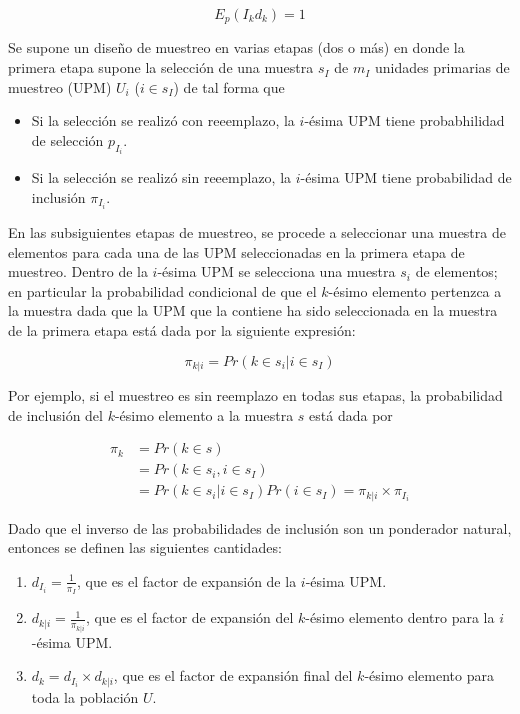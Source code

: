 \documentclass[
  12pt,
  spanish,
]{book}
\providecommand{\tightlist}{%
  \setlength{\itemsep}{0pt}\setlength{\parskip}{0pt}}
\begin{document}
\begin{equation*}
E_p(I_k d_k) = 1
\end{equation*}

Se supone un diseño de muestreo en varias etapas (dos o más) en donde la primera etapa supone la selección de una muestra \(s_I\) de \(m_I\) unidades primarias de muestreo (UPM) \(U_i\) (\(i\in s_I\)) de tal forma que

\begin{itemize}
\tightlist
\item
  Si la selección se realizó con reeemplazo, la \(i\)-ésima UPM tiene probabhilidad de selección \(p_{I_i}\).
\item
  Si la selección se realizó sin reeemplazo, la \(i\)-ésima UPM tiene probabilidad de inclusión \(\pi_{I_i}\).
\end{itemize}

En las subsiguientes etapas de muestreo, se procede a seleccionar una muestra de elementos para cada una de las UPM seleccionadas en la primera etapa de muestreo. Dentro de la \(i\)-ésima UPM se selecciona una muestra \(s_i\) de elementos; en particular la probabilidad condicional de que el \(k\)-ésimo elemento pertenzca a la muestra dada que la UPM que la contiene ha sido seleccionada en la muestra de la primera etapa está dada por la siguiente expresión:

\begin{equation*}
\pi_{k|i} = Pr(k \in s_i | i \in s_I)
\end{equation*}

Por ejemplo, si el muestreo es sin reemplazo en todas sus etapas, la probabilidad de inclusión del \(k\)-ésimo elemento a la muestra \(s\) está dada por

\begin{align*}
\label{piki}
\pi_k & = Pr(k \in s)\\ 
& = Pr(k \in s_i, i \in s_I) \\
& = Pr(k \in s_i | i \in s_I) Pr(i \in s_I) = \pi_{k|i} \times \pi_{I_i}
\end{align*}

Dado que el inverso de las probabilidades de inclusión son un ponderador natural, entonces se definen las siguientes cantidades:

\begin{enumerate}
\def\labelenumi{\arabic{enumi}.}
\tightlist
\item
  \(d_{I_i} = \frac{1}{\pi_I}\), que es el factor de expansión de la \(i\)-ésima UPM.
\item
  \(d_{k|i} = \frac{1}{\pi_{k|i}}\), que es el factor de expansión del \(k\)-ésimo elemento dentro para la \(i\)-ésima UPM.
\item
  \(d_k = d_{I_i} \times d_{k|i}\), que es el factor de expansión final del \(k\)-ésimo elemento para toda la población \(U\).
\end{enumerate}
\end{document}
